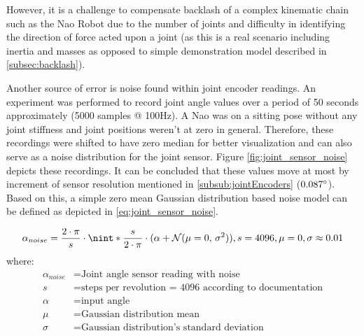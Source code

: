 \documentclass[english, printversion, nomenclature, notitle]{tuvisionthesis} %
\DeclarePairedDelimiter{\nint}\lfloor\rceil
\begin{document}
However, it is a challenge to compensate backlash of a complex kinematic chain such as the Nao Robot due to the number of joints and difficulty in identifying the direction of force acted upon a joint (as this is a real scenario including inertia and masses as opposed to simple demonstration model described in \cref{subsec:backlash}).

Another source of error is noise found within joint encoder readings. An experiment was performed to record joint angle values over a period of 50 seconds approximately (5000 samples @ 100Hz). A Nao was on a sitting pose without any joint stiffness and joint positions weren't at zero in general. Therefore, these recordings were shifted to have zero median for better visualization and can also serve as a noise distribution for the joint sensor. Figure \ref{fig:joint_sensor_noise} depicts these recordings. It can be concluded that these values move at most by increment of sensor resolution mentioned in \cref{subsub:jointEncoders} ($0.087\degree$). Based on this, a simple zero mean Gaussian distribution based noise model can be defined as depicted in \cref{eq:joint_sensor_noise}.

\begin{equation}
\alpha_{noise} = \frac{2 \cdot \pi}{s} \cdot \nint*{\frac{s}{2 \cdot \pi } \cdot ( \alpha + \mathcal{N}(\mu = 0,\,\sigma^{2}))}, s = 4096, \mu = 0, \sigma \approx 0.01
\label{eq:joint_sensor_noise}
\end{equation}
where:
\begin{align*}
\alpha_{noise} &= \text{Joint angle sensor reading with noise}\\
s &= \text{steps per revolution = 4096 according to documentation}\\
\alpha &= \text{input angle}\\
\mu &= \text{Gaussian distribution mean}\\
\sigma &= \text{Gaussian distribution's standard deviation}
\end{align*}
\end{document}
